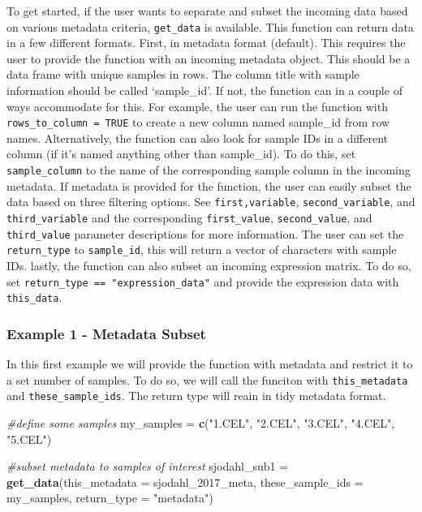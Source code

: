 \documentclass[
]{article}
\newenvironment{Shaded}{\begin{snugshade}}{\end{snugshade}}
\newcommand{\AttributeTok}[1]{\textcolor[rgb]{0.13,0.29,0.53}{#1}}
\newcommand{\CommentTok}[1]{\textcolor[rgb]{0.56,0.35,0.01}{\textit{#1}}}
\newcommand{\FunctionTok}[1]{\textcolor[rgb]{0.13,0.29,0.53}{\textbf{#1}}}
\newcommand{\NormalTok}[1]{#1}
\newcommand{\OtherTok}[1]{\textcolor[rgb]{0.56,0.35,0.01}{#1}}
\newcommand{\StringTok}[1]{\textcolor[rgb]{0.31,0.60,0.02}{#1}}
\begin{document}
To get started, if the user wants to separate and subset the incoming
data based on various metadata criteria, \texttt{get\_data} is
available. This function can return data in a few different formats.
First, in metadata format (default). This requires the user to provide
the function with an incoming metadata object. This should be a data
frame with unique samples in rows. The column title with sample
information should be called `sample\_id'. If not, the function can in a
couple of ways accommodate for this. For example, the user can run the
function with \texttt{rows\_to\_column\ =\ TRUE} to create a new column
named sample\_id from row names. Alternatively, the function can also
look for sample IDs in a different column (if it's named anything other
than sample\_id). To do this, set \texttt{sample\_column} to the name of
the corresponding sample column in the incoming metadata. If metadata is
provided for the function, the user can easily subset the data based on
three filtering options. See \texttt{first,variable},
\texttt{second\_variable}, and \texttt{third\_variable} and the
corresponding \texttt{first\_value}, \texttt{second\_value}, and
\texttt{third\_value} parameter descriptions for more information. The
user can set the \texttt{return\_type} to \texttt{sample\_id}, this will
return a vector of characters with sample IDs. lastly, the function can
also subset an incoming expression matrix. To do so, set
\texttt{return\_type\ ==\ "expression\_data"} and provide the expression
data with \texttt{this\_data}.

\subsubsection{Example 1 - Metadata
Subset}\label{example-1---metadata-subset}

In this first example we will provide the function with metadata and
restrict it to a set number of samples. To do so, we will call the
funciton with \texttt{this\_metadata} and \texttt{these\_sample\_ids}.
The return type will reain in tidy metadata format.

\begin{Shaded}
\begin{Highlighting}[]
\CommentTok{\#define some samples}
\NormalTok{my\_samples }\OtherTok{=} \FunctionTok{c}\NormalTok{(}\StringTok{"1.CEL"}\NormalTok{, }\StringTok{"2.CEL"}\NormalTok{, }\StringTok{"3.CEL"}\NormalTok{, }\StringTok{"4.CEL"}\NormalTok{, }\StringTok{"5.CEL"}\NormalTok{)}

\CommentTok{\#subset metadata to samples of interest}
\NormalTok{sjodahl\_sub1 }\OtherTok{=} \FunctionTok{get\_data}\NormalTok{(}\AttributeTok{this\_metadata =}\NormalTok{ sjodahl\_2017\_meta, }
                       \AttributeTok{these\_sample\_ids =}\NormalTok{ my\_samples, }
                       \AttributeTok{return\_type =} \StringTok{"metadata"}\NormalTok{)}
\end{Highlighting}
\end{Shaded}
\end{document}
